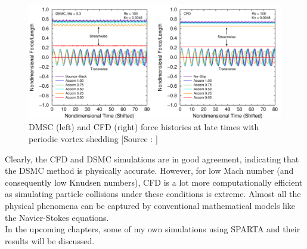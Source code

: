 \begin{figure}[H]
  \includegraphics[scale=0.4]{Pictures/Chapter_4_SPARTA/Comp.png}
  \centering
  \caption{DMSC (left) and CFD (right) force histories at late times with periodic vortex shedding [Source : \cite{gallis2021effect}]}
  \label{img:comp}
\end{figure}

\no Clearly, the CFD and DSMC simulations are in good agreement, indicating that the DSMC method is physically accurate. However, for low Mach number (and consequently low Knudsen numbers), CFD is a lot more computationally efficient as simulating particle collisions under these conditions is extreme. Almost all the physical phenomena can be captured by conventional mathematical models like the Navier-Stokes equations. \\

\no In the upcoming chapters, some of my own simulations using SPARTA and their results will be discussed.